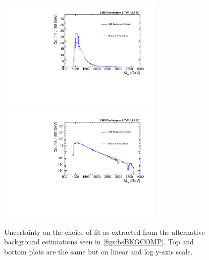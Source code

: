 \begin{figure}[htcb]
\begin{center}
\includegraphics[width=0.7\textwidth]{AN-14-049/figs/BKGFITERR.pdf}\\
\includegraphics[width=0.7\textwidth]{AN-14-049/figs/BKGFITERRLOG.pdf}
\caption{
Uncertainty on the choice of fit as extracted from the alternative background estimations seen in \ref{figs:bsBKGCOMP}. Top and bottom plots are the same but on linear and log y-axis scale.
}
\label{figs:bsBKGERR}
\end{center}
\end{figure}


